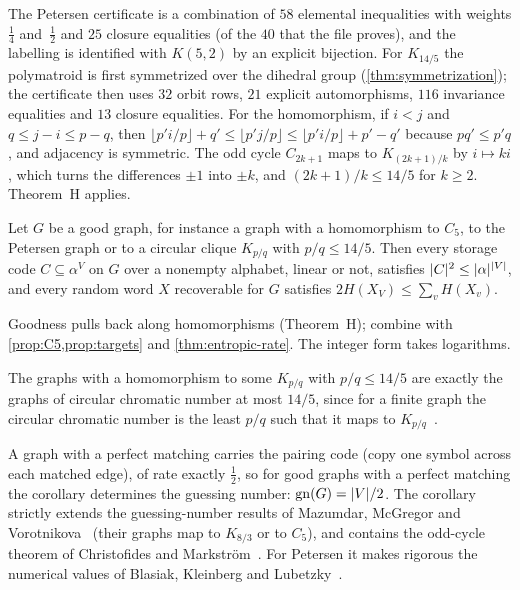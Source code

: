 \begin{outline}
The Petersen certificate is a
combination of $58$ elemental inequalities with weights $\tfrac14$ and~$\tfrac12$ and $25$ closure equalities (of the $40$ that the
file proves), and the labelling is identified with $K(5,2)$ by an explicit bijection. For $K_{14/5}$ the polymatroid is first symmetrized over the
dihedral group (\cref{thm:symmetrization}); the certificate then uses $32$ orbit rows, $21$ explicit automorphisms, $116$
invariance equalities and $13$ closure equalities. For the homomorphism, if $i<j$ and $q\le j-i\le p-q$,
then $\lfloor p'i/p\rfloor+q'\le\lfloor p'j/p\rfloor\le\lfloor p'i/p\rfloor+p'-q'$ because $pq'\le p'q$, and adjacency is
symmetric. The odd cycle $C_{2k+1}$ maps to $K_{(2k+1)/k}$ by $i\mapsto ki$, which turns the differences $\pm1$ into
$\pm k$, and $(2k+1)/k\le14/5$ for $k\ge2$. Theorem~H applies.
\end{outline}

\begin{corollary}\label{cor:H2}
Let $G$ be a good graph, for instance a graph with a homomorphism to $C_5$, to the Petersen graph or to a circular clique
$K_{p/q}$ with $p/q\le14/5$. Then every storage code $C\subseteq\alpha^{V}$ on $G$ over a nonempty alphabet, linear or
not, satisfies $\lvert C \rvert^2\le\lvert \alpha \rvert^{\lvert V \rvert}$, and every random word $X$ recoverable for $G$ satisfies
$2H(X_V)\le\sum_vH(X_v)$.
\end{corollary}

\begin{outline}
Goodness pulls back along homomorphisms (Theorem~H); combine with \cref{prop:C5,prop:targets} and
\cref{thm:entropic-rate}. The integer form takes logarithms.
\end{outline}

The graphs with a homomorphism to some $K_{p/q}$ with $p/q\le14/5$ are exactly the graphs of circular chromatic number at
most $14/5$, since for a finite graph the circular chromatic number is the least $p/q$ such that it maps to
$K_{p/q}$~\cite{Vince1988,Zhu2001}.

A graph with a perfect matching carries the pairing code (copy one symbol across each matched edge), of rate exactly
$\tfrac12$, so for good graphs with a perfect matching the corollary determines the guessing number:
$\mathrm{gn}(G)=\lvert V \rvert/2$. The corollary strictly
extends the guessing-number results of Mazumdar, McGregor and Vorotnikova~\cite[Thms~9--11]{MMV2019} (their graphs map to
$K_{8/3}$ or to $C_5$), and contains the odd-cycle theorem of Christofides and Markström~\cite{ChristofidesMarkstrom2011}.
For Petersen it makes rigorous the numerical values of Blasiak, Kleinberg and Lubetzky~\cite{BKL2013}.


